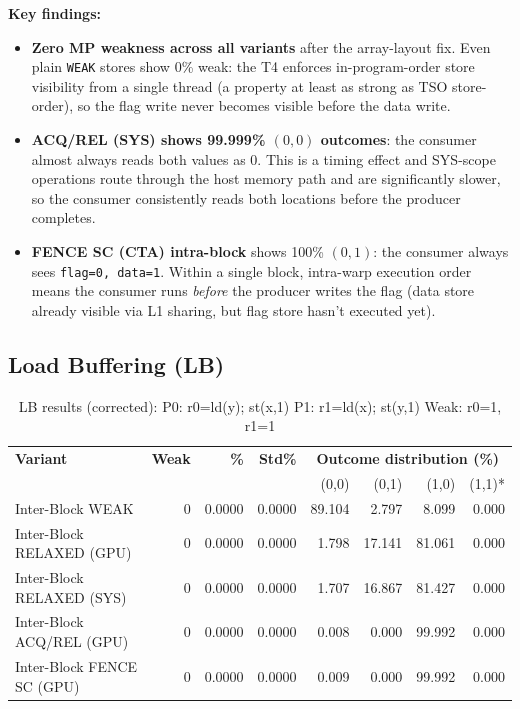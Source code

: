 \documentclass[a4paper]{article}
\begin{document}
\textbf{Key findings:}
\begin{itemize}
  \item \textbf{Zero MP weakness across all variants} after the array-layout fix.
    Even plain \texttt{WEAK} stores show 0\% weak: the T4 enforces in-program-order store visibility from a single thread (a property at least as strong as TSO store-order), so the flag write never becomes visible before the data write.
  \item \textbf{ACQ/REL (SYS) shows 99.999\% $(0,0)$ outcomes}: the consumer almost always reads both values as 0. This is a timing effect and SYS-scope operations route through the host memory path and are significantly slower, so the consumer consistently reads both locations before the producer completes.
  \item \textbf{FENCE SC (CTA) intra-block} shows 100\% $(0,1)$: the consumer always sees \texttt{flag=0, data=1}. Within a single block, intra-warp execution order means the consumer runs \emph{before} the producer writes the flag (data store already visible via L1 sharing, but flag store hasn't executed yet).
\end{itemize}

\subsection{Load Buffering (LB)}

\begin{table}[H]
\centering
\small
\caption{LB results (corrected): P0: r0=ld(y); st(x,1) \quad P1: r1=ld(x); st(y,1) \quad Weak: r0=1, r1=1}
\label{tab:lb-results}
\begin{tabular}{l|r r r | r r r r}
\toprule
\textbf{Variant} & \textbf{Weak} & \textbf{\%} & \textbf{Std\%} & \multicolumn{4}{c}{\textbf{Outcome distribution (\%)}} \\
                 &               &             &                & (0,0) & (0,1) & (1,0) & (1,1)* \\
\midrule
Inter-Block WEAK          & 0 & 0.0000 & 0.0000 & 89.104 &  2.797 &  8.099 & 0.000 \\
Inter-Block RELAXED (GPU) & 0 & 0.0000 & 0.0000 &  1.798 & 17.141 & 81.061 & 0.000 \\
Inter-Block RELAXED (SYS) & 0 & 0.0000 & 0.0000 &  1.707 & 16.867 & 81.427 & 0.000 \\
Inter-Block ACQ/REL (GPU) & 0 & 0.0000 & 0.0000 &  0.008 &  0.000 & 99.992 & 0.000 \\
Inter-Block FENCE SC (GPU)& 0 & 0.0000 & 0.0000 &  0.009 &  0.000 & 99.992 & 0.000 \\
\bottomrule
\end{tabular}
\end{table}
\end{document}
